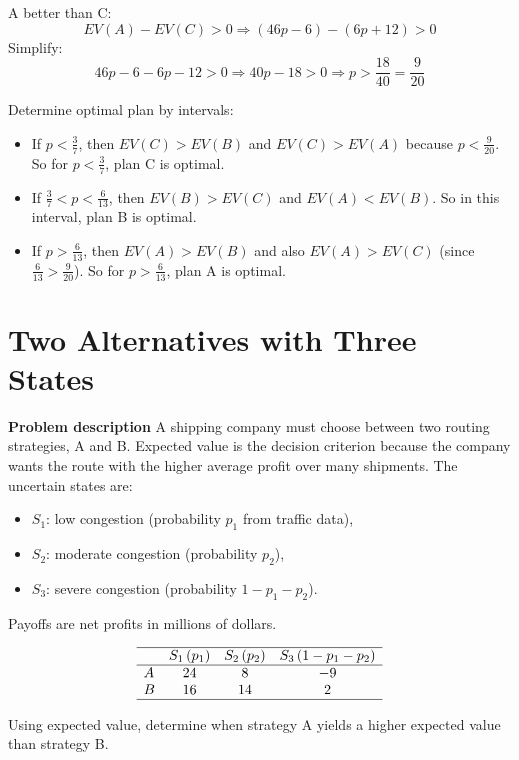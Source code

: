 \begin{ExamProblems}
		A better than C:
		\[
		EV(A)-EV(C)>0 \Rightarrow (46p-6)-(6p+12)>0
		\]
		Simplify:
		\[
		46p-6-6p-12>0 \Rightarrow 40p-18>0 \Rightarrow p>\frac{18}{40}=\frac{9}{20}
		\]
		
		Determine optimal plan by intervals:
		\begin{itemize}
			\item If \(p<\frac{3}{7}\), then \(EV(C)>EV(B)\) and \(EV(C)>EV(A)\) because \(p<\frac{9}{20}\). So for \(p<\frac{3}{7}\), plan C is optimal.
			\item If \(\frac{3}{7}<p<\frac{6}{13}\), then \(EV(B)>EV(C)\) and \(EV(A)<EV(B)\). So in this interval, plan B is optimal.
			\item If \(p>\frac{6}{13}\), then \(EV(A)>EV(B)\) and also \(EV(A)>EV(C)\) (since \(\frac{6}{13}>\frac{9}{20}\)). So for \(p>\frac{6}{13}\), plan A is optimal.
		\end{itemize}
		
		
		\hypertarget{c7-ex5}{}
		\item
		\section{Two Alternatives with Three States}
		
		\textbf{Problem description}
		A shipping company must choose between two routing strategies, A and B. Expected value is the decision criterion because the company wants the route with the higher average profit over many shipments. The uncertain states are:
		\begin{itemize}
			\item \(S_1\): low congestion (probability \(p_1\) from traffic data),
			\item \(S_2\): moderate congestion (probability \(p_2\)),
			\item \(S_3\): severe congestion (probability \(1-p_1-p_2\)).
		\end{itemize}
		Payoffs are net profits in millions of dollars.
		
		\[
		\begin{array}{lccc}
			\hline
			& S_1\,(p_1) & S_2\,(p_2) & S_3\,(1-p_1-p_2) \\
			\hline
			A & 24 & 8 & -9 \\
			B & 16 & 14 & 2 \\
			\hline
		\end{array}
		\]
		
		Using expected value, determine when strategy A yields a higher expected value than strategy B.
		

\end{ExamProblems}
